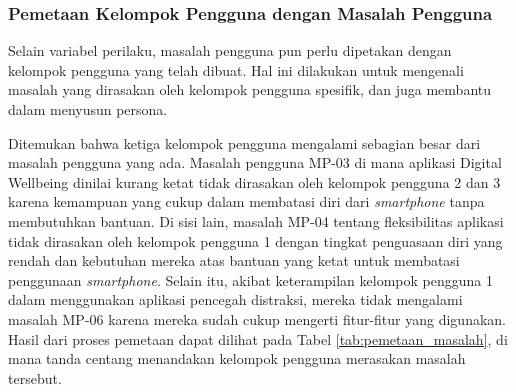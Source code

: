\subsubsection{Pemetaan Kelompok Pengguna dengan Masalah Pengguna}
Selain variabel perilaku, masalah pengguna pun perlu dipetakan dengan kelompok pengguna yang telah dibuat. Hal ini dilakukan untuk mengenali masalah yang dirasakan oleh kelompok pengguna spesifik, dan juga membantu dalam menyusun persona.

Ditemukan bahwa ketiga kelompok pengguna mengalami sebagian besar dari masalah pengguna yang ada. Masalah pengguna MP-03 di mana aplikasi Digital Wellbeing dinilai kurang ketat tidak dirasakan oleh kelompok pengguna 2 dan 3 karena kemampuan yang cukup dalam membatasi diri dari \textit{smartphone} tanpa membutuhkan bantuan. Di sisi lain, masalah MP-04 tentang fleksibilitas aplikasi tidak dirasakan oleh kelompok pengguna 1 dengan tingkat penguasaan diri yang rendah dan kebutuhan mereka atas bantuan yang ketat untuk membatasi penggunaan \textit{smartphone}. Selain itu, akibat keterampilan kelompok pengguna 1 dalam menggunakan aplikasi pencegah distraksi, mereka tidak mengalami masalah MP-06 karena mereka sudah cukup mengerti fitur-fitur yang digunakan. Hasil dari proses pemetaan dapat dilihat pada Tabel \ref{tab:pemetaan_masalah}, di mana tanda centang menandakan kelompok pengguna merasakan masalah tersebut.

